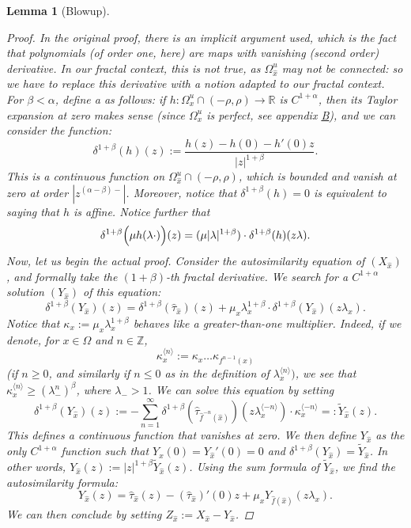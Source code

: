 \documentclass[a4paper]{article}
\newtheorem{lemma}[theorem]{Lemma}
\theoremstyle{definition}
\begin{document}
\begin{lemma}[Blowup]
\begin{proof}
In the original proof, there is an implicit argument used, which is the fact that polynomials (of order one, here) are maps with vanishing (second order) derivative. In our fractal context, this is not true, as $\Omega_{\widehat{x}}^u$ may not be connected: so we have to replace this derivative with a notion adapted to our fractal context. For $\beta<\alpha$, define a  as follows: if $h:\Omega_x^u \cap (-\rho,\rho) \rightarrow \mathbb{R}$ is ${C^{1+\alpha}}$, then its Taylor expansion at zero makes sense (since $\Omega_x^u$ is perfect, see appendix \hyperref[ap:B]{B}), and we can consider the function:
$$ \delta^{1+\beta}(h)(z) := \frac{h(z) - h(0) - h'(0) z}{|z|^{1+\beta}}. $$
This is a continuous function on $\Omega_{\widehat{x}}^u \cap (-\rho,\rho)$, which is bounded and vanish at zero at order $|z^{(\alpha-\beta)-}|$. Moreover, notice that $\delta^{1+\beta}(h)=0$ is equivalent to saying that $h$ is affine. Notice further that $$ \delta^{1+\beta}\Big{(} \mu h(\lambda \cdot) \Big{)}(z) = (\mu |\lambda|^{1+\beta}) \cdot \delta^{1+\beta}(h)(z \lambda ).$$
Now, let us begin the actual proof. Consider the autosimilarity equation of $(X_{\widehat{x}})$, and formally take the $(1+\beta)$-th fractal derivative. We search for a $C^{1+\alpha}$ solution $(Y_{\widehat{x}})$ of this equation:
$$ \delta^{1+\beta}(Y_{\widehat{x}})(z) = \delta^{1+\beta}(\widehat{\tau}_{\widehat{x}})(z) + \mu_x \lambda_x^{1+\beta} \cdot \delta^{1+\beta}(Y_{\widehat{x}})(z \lambda_x). $$
Notice that $\kappa_x := \mu_x \lambda_x^{1+\beta}$ behaves like a greater-than-one multiplier. Indeed, if we denote, for $x \in \Omega$ and $n \in \mathbb{Z}$, $$\kappa_x^{\langle n \rangle}  := \kappa_x \dots \kappa_{f^{n-1}(x)} $$
(if $n \geq 0$, and similarly if $n \leq 0$ as in the definition of $\lambda_x^{\langle n \rangle}) $,
we see that $\kappa_x^{\langle n \rangle} \geq (\lambda_-^n)^{\beta}$, where $\lambda_- > 1$. We can solve this equation by setting
$$ \delta^{1+\beta}(Y_{\widehat{x}})(z) := -\sum_{n=1}^\infty \delta^{1+\beta}(\widehat{\tau}_{\widehat{f}^{-n}({\widehat{x}})})(z \lambda_x^{\langle - n \rangle}) \cdot \kappa_x^{\langle - n \rangle} =: \tilde{Y}_{\widehat{x}}(z).$$
This defines a continuous function that vanishes at zero. We then define $Y_{\widehat{x}}$ as the only $C^{1+\alpha}$ function such that $ Y_{\widehat{x}}(0)=Y_{\widehat{x}}'(0)=0 $ and $\delta^{1+\beta}(Y_{\widehat{x}}) = \tilde{Y}_{\widehat{x}}$. In other words, $Y_{\widehat{x}}(z) := |z|^{1+\beta} \tilde{Y}_{\widehat{x}}(z)$. Using the sum formula of $\tilde{Y}_{\widehat{x}}$, we find the autosimilarity formula:
$$ Y_{\widehat{x}}(z) = \widehat{\tau}_{\widehat{x}}(z) - (\widehat{\tau}_{\widehat{x}})'(0)z + \mu_x Y_{\widehat{f}({\widehat{x}})}(z \lambda_x) .$$
We can then conclude by setting $Z_{\widehat{x}} := X_{\widehat{x}} - Y_{\widehat{x}}$.
\end{proof}
\end{lemma}
\end{document}
